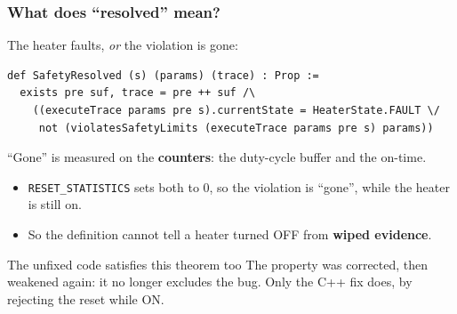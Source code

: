 \begin{frame}[fragile]
  \frametitle{What does ``resolved'' mean?} \small
{}

\vspace{-0.1cm}
The heater faults, {\em or} the violation is gone:

\begin{lstlisting}[language=lean4]
def SafetyResolved (s) (params) (trace) : Prop :=
  exists pre suf, trace = pre ++ suf /\
    ((executeTrace params pre s).currentState = HeaterState.FAULT \/
     not (violatesSafetyLimits (executeTrace params pre s) params))
\end{lstlisting}

\pause
\vspace{0.15cm}

``Gone'' is measured on the {\bf counters}: the duty-cycle buffer and the on-time.

\begin{itemize}\small
\item {\tt RESET\_STATISTICS} sets both to 0, so the violation is ``gone'', while the
      heater is still on.
\item So the definition cannot tell a heater turned OFF from {\bf wiped evidence}.
\end{itemize}

\pause
\vspace{0.15cm}

\begin{block}{The unfixed code satisfies this theorem too}\small
The property was corrected, then weakened again: it no longer excludes the bug. Only
the C++ fix does, by rejecting the reset while ON.
\end{block}

\end{frame}
